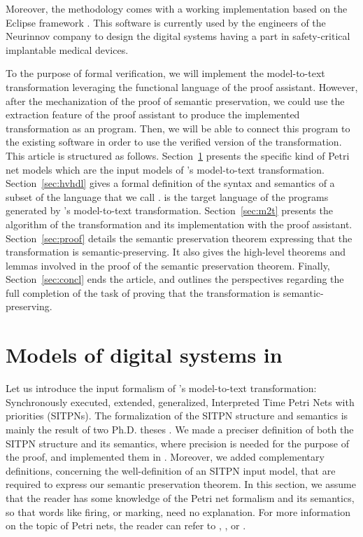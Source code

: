 \documentclass[pdflatex,sn-mathphys]{sn-jnl}%
\theoremstyle{thmstyleone}%
\theoremstyle{thmstyletwo}%
\theoremstyle{thmstylethree}%
\begin{document}
Moreover, the \hilecop{} methodology comes with a working
implementation based on the Eclipse framework . This software is
currently used by the engineers of the Neurinnov company to design the
digital systems having a part in safety-critical implantable medical
devices.

To the purpose of formal verification, we will implement the
\hilecop{} model-to-text transformation leveraging the functional
language of the \coq{} proof assistant. However, after the
mechanization of the proof of semantic preservation, we could use the
extraction feature of the \coq{} proof assistant to produce the
implemented transformation as an \ocaml{} program. Then, we will be
able to connect this program to the existing \hilecop{} software in
order
to use the verified version of the transformation.\\

This article is structured as
follows. Section~\ref{sec:hilecop-models} presents the specific kind
of Petri net models which are the input models of \hilecop{}'s
model-to-text transformation.  Section~\ref{sec:hvhdl} gives a formal
definition of the syntax and semantics of a subset of the \vhdl{}
language that we call \hvhdl{}. \hvhdl{} is the target language of the
programs generated by \hilecop{}'s model-to-text transformation.
Section~\ref{sec:m2t} presents the algorithm of the transformation and
its implementation with the \coq{} proof assistant.
Section~\ref{sec:proof} details the semantic preservation theorem
expressing that the \hilecop{} transformation is semantic-preserving.
It also gives the high-level theorems and lemmas involved in the proof
of the semantic preservation theorem.  Finally,
Section~\ref{sec:concl} ends the article, and outlines the
perspectives regarding the full completion of the task of proving that
the \hilecop{} transformation is semantic-preserving.

\section{Models of digital systems in \hilecop{}}
\label{sec:hilecop-models}

Let us introduce the input formalism of \hilecop{}'s model-to-text
transformation: Synchronously executed, extended, generalized,
Interpreted Time Petri Nets with priorities (SITPNs). The
formalization of the SITPN structure and semantics is mainly the
result of two Ph.D. theses \cite{Leroux2014,Merzoug2018}. We made a
preciser definition of both the SITPN structure and its semantics,
where precision is needed for the purpose of the proof, and
implemented them in \coq{}. Moreover, we added complementary
definitions, concerning the well-definition of an SITPN input model,
that are required to express our semantic preservation theorem. In
this section, we assume that the reader has some knowledge of the
Petri net formalism and its semantics, so that words like firing, or
marking, need no explanation. For more information on the topic of
Petri nets, the reader can refer to \cite{David1994},
\cite{Murata1989}, or \cite{Diaz2001}.
\end{document}

